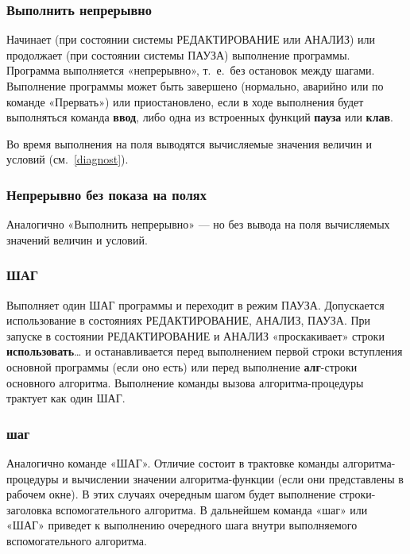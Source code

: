 \documentclass[12pt,a4paper]{article}
\begin{document}
\subsubsection{Выполнить непрерывно}

Начинает (при состоянии системы РЕДАКТИРОВАНИЕ или АНАЛИЗ) или продолжает (при состоянии системы ПАУЗА) выполнение программы. Программа выполняется «непрерывно», т.~е.~без остановок между шагами. Выполнение программы может быть завершено (нормально, аварийно или по команде «Прервать») или приостановлено, если в ходе выполнения будет выполняться команда \textsf{\textbf{ввод}}, либо одна из встроенных функций \textsf{\textbf{пауза}} или \textsf{\textbf{клав}}.

Во время выполнения на поля выводятся вычисляемые значения величин и условий (см.~\ref{diagnost}).

\subsubsection{Непрерывно без показа на полях}

Аналогично «Выполнить непрерывно» --- но без вывода на поля вычисляемых значений величин и условий.

\subsubsection{ШАГ}

Выполняет один ШАГ программы и переходит в режим ПАУЗА. Допускается использование в состояниях РЕДАКТИРОВАНИЕ, АНАЛИЗ, ПАУЗА. При запуске в состоянии РЕДАКТИРОВАНИЕ и АНАЛИЗ «проскакивает» строки \textsf{\textbf{использовать}\dots} и останавливается перед выполнением первой строки вступления основной программы (если оно есть) или перед выполнение \textsf{\textbf{алг}}-строки основного алгоритма. Выполнение команды вызова алгоритма-процедуры трактует как один ШАГ.

\subsubsection{шаг}

Аналогично команде «ШАГ». Отличие состоит в трактовке команды алгоритма- процедуры и вычислении значении алгоритма-функции (если они представлены в рабочем окне). В этих случаях очередным шагом будет выполнение строки-заголовка вспомогательного алгоритма. В дальнейшем команда «шаг» или «ШАГ» приведет к выполнению очередного шага внутри выполняемого вспомогательного алгоритма.
\end{document}
